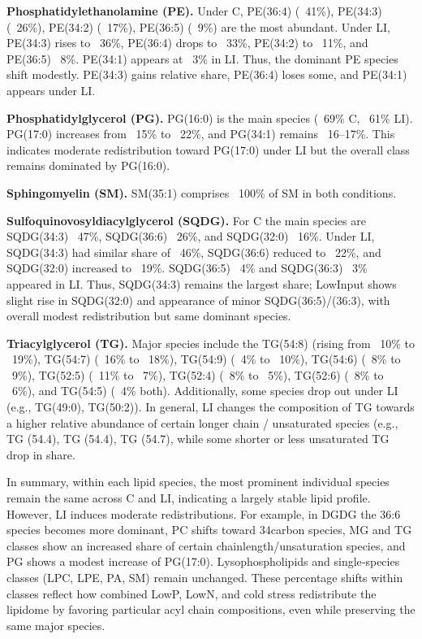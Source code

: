 \documentclass[10pt,letterpaper]{article}
\begin{document}
\textbf{Phosphatidylethanolamine (PE).}  
Under C, PE(36:4) (~41\%), PE(34:3) (~26\%), PE(34:2) (~17\%), PE(36:5) (~9\%) are the most abundant. Under LI, PE(34:3) rises to ~36\%, PE(36:4) drops to ~33\%, PE(34:2) to ~11\%, and PE(36:5) ~8\%. PE(34:1) appears at ~3\% in LI. Thus, the dominant PE species shift modestly. PE(34:3) gains relative share, PE(36:4) loses some, and PE(34:1) appears under LI.

\textbf{Phosphatidylglycerol (PG).}  
PG(16:0) is the main species (~69\% C, ~61\% LI). PG(17:0) increases from ~15\% to ~22\%, and PG(34:1) remains ~16–17\%. This indicates moderate redistribution toward PG(17:0) under LI but the overall class remains dominated by PG(16:0).

\textbf{Sphingomyelin (SM).}  
SM(35:1) comprises ~100\% of SM in both conditions.

\textbf{Sulfoquinovosyldiacylglycerol (SQDG).}  
For C the main species are SQDG(34:3) ~47\%, SQDG(36:6) ~26\%, and SQDG(32:0) ~16\%. Under LI, SQDG(34:3) had similar share of ~46\%, SQDG(36:6) reduced to ~22\%, and SQDG(32:0) increased to ~19\%. SQDG(36:5) ~4\% and SQDG(36:3) ~3\% appeared in LI. Thus, SQDG(34:3) remains the largest share; LowInput shows slight rise in SQDG(32:0) and appearance of minor SQDG(36:5)/(36:3), with overall modest redistribution but same dominant species.

\textbf{Triacylglycerol (TG).}  
Major species include the TG(54:8) (rising from ~10\% to ~19\%), TG(54:7) (~16\% to ~18\%), TG(54:9) (~4\% to ~10\%), TG(54:6) (~8\% to ~9\%), TG(52:5) (~11\% to ~7\%), TG(52:4) (~8\% to ~5\%), TG(52:6) (~8\% to ~6\%), and TG(54:5) (~4\% both). Additionally, some species drop out under LI (e.g., TG(49:0), TG(50:2)). In general, LI changes the composition of TG towards a higher relative abundance of certain longer chain / unsaturated species (e.g., TG (54.4), TG (54.4), TG (54.7), while some shorter or less unsaturated TG drop in share.

\bigskip

In summary, within each lipid species, the most prominent individual species remain the same across C and LI, indicating a largely stable lipid profile. However, LI induces moderate redistributions. For example, in DGDG the 36:6 species becomes more dominant, PC shifts toward 34carbon species, MG and TG classes show an increased share of certain chainlength/unsaturation species, and PG shows a modest increase of PG(17:0). Lysophospholipids and single‐species classes (LPC, LPE, PA, SM) remain unchanged. These percentage shifts within classes reflect how combined LowP, LowN, and cold stress redistribute the lipidome by favoring particular acyl chain compositions, even while preserving the same major species.  
\end{document}
